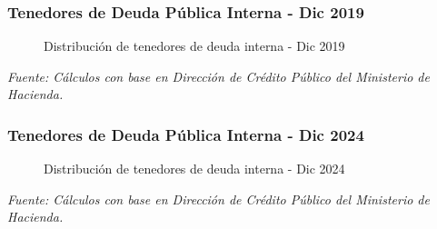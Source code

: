 \begin{frame}
  \frametitle{Tenedores de Deuda Pública Interna - Dic 2019}

  \begin{figure}
    \centering
    \caption{Distribución de tenedores de deuda interna - Dic 2019}
    \label{fig:debt-holders-2019}
  \end{figure}

  \vspace{0.3cm}
  \footnotesize{\textit{Fuente: Cálculos con base en Dirección de Crédito Público del Ministerio de Hacienda.}}
\end{frame}

\begin{frame}
  \frametitle{Tenedores de Deuda Pública Interna - Dic 2024}

  \begin{figure}
    \centering
    \caption{Distribución de tenedores de deuda interna - Dic 2024}
    \label{fig:debt-holders-2024}
  \end{figure}

  \vspace{0.3cm}
  \footnotesize{\textit{Fuente: Cálculos con base en Dirección de Crédito Público del Ministerio de Hacienda.}}
\end{frame}
